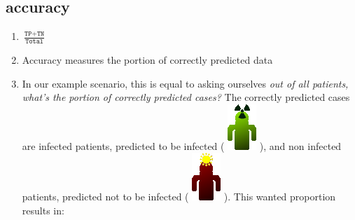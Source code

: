 \documentclass[12pt,a4paper]{article}
\begin{document}
\subsection{accuracy}
\begin{enumerate}
\item $\frac{\texttt{TP}+\texttt{TN}}{\texttt{Total}}$
\item Accuracy measures the portion of correctly predicted data
\item In our example scenario, this is equal to asking ourselves \textit{out of all patients, what's the portion of correctly predicted cases?} The correctly predicted cases are infected patients, predicted to be infected ( \includegraphics[scale=0.3]{resources/5/exampleTP} ), and non infected patients, predicted not to be infected ( \includegraphics[scale=0.3]{resources/5/exampleTN} ). This wanted proportion results in: 
\end{enumerate}
\end{document}
